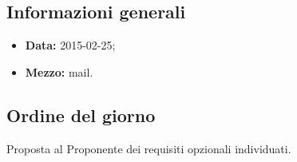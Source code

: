 \subsection{Informazioni generali}
\begin{itemize}
	\item \textbf{Data:} 2015-02-25;
	\item \textbf{Mezzo:} mail.
\end{itemize}

\subsection{Ordine del giorno}
Proposta al Proponente dei requisiti opzionali individuati.

